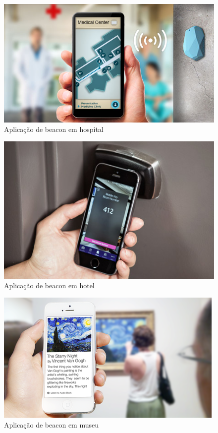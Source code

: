 \begin{figure}[H]
\caption{Aplicação de beacon em hospital}
\centerline{\includegraphics[scale=0.5]{img/beaconHospital}}
\label{fig:beaconHospital}
\end{figure}

\begin{figure}[H]
\caption{Aplicação de beacon em hotel}
\centerline{\includegraphics[scale=0.5]{img/beaconHotel}}
\label{fig:beaconHotel}
\end{figure}

\begin{figure}[H]
\caption{Aplicação de beacon em museu}
\centerline{\includegraphics[scale=0.5]{img/beaconMuseu}}
\label{fig:beaconMuseu}
\end{figure}

